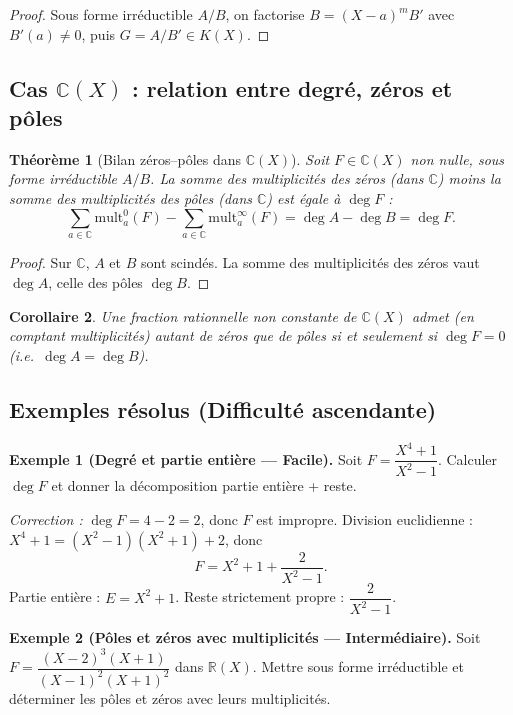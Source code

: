 \documentclass[12pt,a4paper]{report}
\newtheorem{theoreme}{Théorème}[section]
\newtheorem{corollaire}[theoreme]{Corollaire}
\theoremstyle{definition}
\theoremstyle{remark}
\begin{document}
\begin{proof}
Sous forme irréductible $A/B$, on factorise $B = (X - a)^m B'$ avec $B'(a) \neq 0$, puis $G = A/B' \in K(X)$.
\end{proof}

\subsection{Cas $\mathbb{C}(X)$ : relation entre degré, zéros et pôles}

\begin{theoreme}[Bilan zéros--pôles dans $\mathbb{C}(X)$]
Soit $F \in \mathbb{C}(X)$ non nulle, sous forme irréductible $A/B$. La somme des multiplicités des zéros (dans $\mathbb{C}$) moins la somme des multiplicités des pôles (dans $\mathbb{C}$) est égale à $\deg F$ :
\[ \sum_{a \in \mathbb{C}} \mathrm{mult}^0_a(F) - \sum_{a \in \mathbb{C}} \mathrm{mult}^\infty_a(F) = \deg A - \deg B = \deg F. \]
\end{theoreme}

\begin{proof}
Sur $\mathbb{C}$, $A$ et $B$ sont scindés. La somme des multiplicités des zéros vaut $\deg A$, celle des pôles $\deg B$.
\end{proof}

\begin{corollaire}
Une fraction rationnelle non constante de $\mathbb{C}(X)$ admet (en comptant multiplicités) autant de zéros que de pôles si et seulement si $\deg F = 0$ (i.e.\ $\deg A = \deg B$).
\end{corollaire}

\subsection{Exemples résolus (Difficulté ascendante)}

\textbf{Exemple 1 (Degré et partie entière --- Facile).}
Soit $F = \dfrac{X^4 + 1}{X^2 - 1}$. Calculer $\deg F$ et donner la décomposition partie entière + reste.

\textit{Correction :} $\deg F = 4 - 2 = 2$, donc $F$ est impropre. Division euclidienne :
$X^4 + 1 = (X^2 - 1)(X^2 + 1) + 2$, donc
\[ F = X^2 + 1 + \frac{2}{X^2 - 1}. \]
Partie entière : $E = X^2 + 1$. Reste strictement propre : $\dfrac{2}{X^2 - 1}$.

\medskip

\textbf{Exemple 2 (Pôles et zéros avec multiplicités --- Intermédiaire).}
Soit $F = \dfrac{(X - 2)^3 (X + 1)}{(X - 1)^2 (X + 1)^2}$ dans $\mathbb{R}(X)$. Mettre sous forme irréductible et déterminer les pôles et zéros avec leurs multiplicités.
\end{document}

